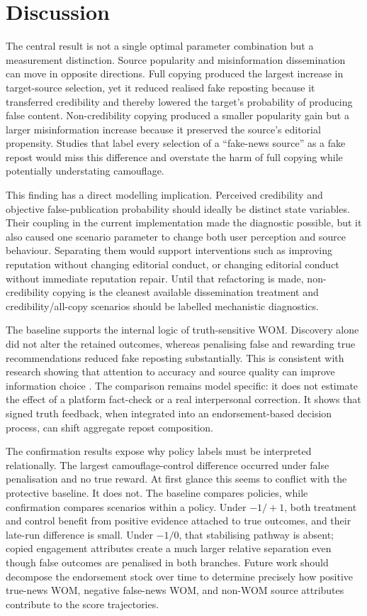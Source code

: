\section{Discussion}
\label{sec:discussion}

The central result is not a single optimal parameter combination but a measurement distinction. Source popularity and misinformation dissemination can move in opposite directions. Full copying produced the largest increase in target-source selection, yet it reduced realised fake reposting because it transferred credibility and thereby lowered the target's probability of producing false content. Non-credibility copying produced a smaller popularity gain but a larger misinformation increase because it preserved the source's editorial propensity. Studies that label every selection of a ``fake-news source'' as a fake repost would miss this difference and overstate the harm of full copying while potentially understating camouflage.

This finding has a direct modelling implication. Perceived credibility and objective false-publication probability should ideally be distinct state variables. Their coupling in the current implementation made the diagnostic possible, but it also caused one scenario parameter to change both user perception and source behaviour. Separating them would support interventions such as improving reputation without changing editorial conduct, or changing editorial conduct without immediate reputation repair. Until that refactoring is made, non-credibility copying is the cleanest available dissemination treatment and credibility/all-copy scenarios should be labelled mechanistic diagnostics.

The baseline supports the internal logic of truth-sensitive WOM. Discovery alone did not alter the retained outcomes, whereas penalising false and rewarding true recommendations reduced fake reposting substantially. This is consistent with research showing that attention to accuracy and source quality can improve information choice \citep{pennycook2019,pennycook2020,epstein2021}. The comparison remains model specific: it does not estimate the effect of a platform fact-check or a real interpersonal correction. It shows that signed truth feedback, when integrated into an endorsement-based decision process, can shift aggregate repost composition.

The confirmation results expose why policy labels must be interpreted relationally. The largest camouflage-control difference occurred under false penalisation and no true reward. At first glance this seems to conflict with the protective baseline. It does not. The baseline compares policies, while confirmation compares scenarios within a policy. Under $-1/+1$, both treatment and control benefit from positive evidence attached to true outcomes, and their late-run difference is small. Under $-1/0$, that stabilising pathway is absent; copied engagement attributes create a much larger relative separation even though false outcomes are penalised in both branches. Future work should decompose the endorsement stock over time to determine precisely how positive true-news WOM, negative false-news WOM, and non-WOM source attributes contribute to the score trajectories.

